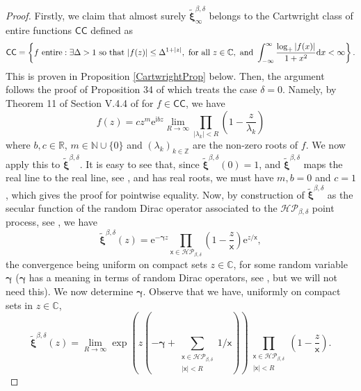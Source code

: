 \documentclass[]{article}
\begin{document}
\begin{proof} 
Firstly, we claim that almost surely $\tilde{\boldsymbol{\xi}}_\infty^{\beta,\delta}$ belongs to the Cartwright class of entire functions $\mathsf{CC}$ defined as
\begin{equation*}
\mathsf{CC}=\left\{f  \ \textnormal{entire}: \exists \Delta >1 \textnormal{ so that } |f(z)|\le  \Delta^{1+|z|}, \textnormal{ for all } z \in \mathbb{C}, \textnormal{ and }  \int_{-\infty}^\infty\frac{\log_+|f(x)|}{1+x^2} \mathrm{d}x <\infty \right\}.
\end{equation*}
This is proven in Proposition \ref{CartwrightProp} below. Then, the argument follows the proof of Proposition 34 of \cite{ValkoVirag} which treats the case $\delta=0$. Namely, by Theorem 11 of Section V.4.4 of \cite{Levin} for $f \in \mathsf{CC}$, we have
\begin{equation*}
f(z)=cz^m\mathrm{e}^{\mathrm{i}bz}\lim_{R \to \infty} \prod_{|\lambda_k|<R}\left(1-\frac{z}{\lambda_k}\right)
\end{equation*}
where $b,c\in \mathbb{R}$, $m\in \mathbb{N}\cup\{0\}$ and $(\lambda_k)_{k \in \mathbb{Z}}$ are the non-zero roots of $f$.  We now apply this to $\tilde{\boldsymbol{\xi}}^{\beta,\delta}$. It is easy to see that, since $\tilde{\boldsymbol{\xi}}^{\beta,\delta}(0)=1$, and $\tilde{\boldsymbol{\xi}}^{\beta,\delta}$ maps the real line to the real line, see \cite{LiValko}, and has real roots, we must have $m,b=0$ and $c=1$, which gives the proof for pointwise equality. Now, by construction of $\tilde{\boldsymbol{\xi}}^{\beta,\delta}$ as the secular function of the random Dirac operator associated to the $\mathcal{HP}_{\beta,\delta}$ point process, see \cite{LiValko}, we have
\begin{equation*}
\tilde{\boldsymbol{\xi}}^{\beta,\delta}(z)=\mathrm{e}^{-\boldsymbol{\gamma}z}\prod_{\mathsf{x}\in \mathcal{HP}_{\beta,\delta}}\left(1-\frac{z}{\mathsf{x}}\right)\mathrm{e}^{z/\mathsf{x}},
\end{equation*}
the convergence being uniform on compact sets $z\in \mathbb{C}$, for some random variable $\boldsymbol{\gamma}$ ($\boldsymbol{\gamma}$ has a meaning in terms of random Dirac operators, see \cite{ValkoVirag,LiValko}, but we will not need this). We now determine $\boldsymbol{\gamma}$. Observe that we have, uniformly on compact sets in $z\in \mathbb{C}$,
\begin{equation*}
\tilde{\boldsymbol{\xi}}^{\beta,\delta}(z)=\lim_{R \to \infty}\exp\left(z\left(-\boldsymbol{\gamma}+\sum_{\substack{\mathsf{x} \in \mathcal{HP}_{\beta,\delta} \\ |\mathsf{x}|<R}}1/\mathsf{x}\right)\right)\prod_{\substack{\mathsf{x} \in \mathcal{HP}_{\beta,\delta} \\ |\mathsf{x}|<R}}\left(1-\frac{z}{\mathsf{x}}\right).

\end{equation*}
\end{proof}
\end{document}
